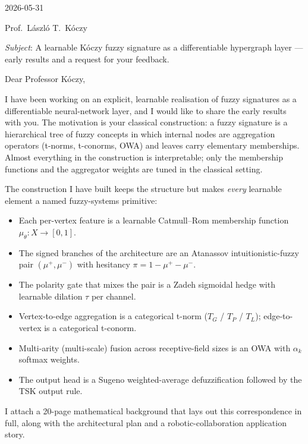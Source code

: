 \documentclass[11pt]{article}
\begin{document}
\begin{flushright}
2026-05-31
\end{flushright}

\noindent Prof.\ László T.\ Kóczy

\textit{Subject}: A learnable Kóczy fuzzy signature as a
differentiable hypergraph layer — early results and a request for
your feedback.

Dear Professor Kóczy,

I have been working on an explicit, learnable realisation of fuzzy
signatures as a differentiable neural-network layer, and I would
like to share the early results with you. The motivation is your
classical construction: a fuzzy signature is a hierarchical tree of
fuzzy concepts in which internal nodes are aggregation operators
(t-norms, t-conorms, OWA) and leaves carry elementary memberships.
Almost everything in the construction is interpretable; only the
membership functions and the aggregator weights are tuned in the
classical setting.

The construction I have built keeps the structure but makes
\emph{every} learnable element a named fuzzy-systems primitive:

\begin{itemize}
  \item Each per-vertex feature is a learnable Catmull--Rom
        membership function $\mu_\theta\colon X\to[0,1]$.
  \item The signed branches of the architecture are an Atanassov
        intuitionistic-fuzzy pair $(\mu^+, \mu^-)$ with hesitancy
        $\pi = 1 - \mu^+ - \mu^-$.
  \item The polarity gate that mixes the pair is a Zadeh sigmoidal
        hedge with learnable dilation $\tau$ per channel.
  \item Vertex-to-edge aggregation is a categorical t-norm ($T_G$ /
        $T_P$ / $T_L$); edge-to-vertex is a categorical t-conorm.
  \item Multi-arity (multi-scale) fusion across receptive-field
        sizes is an OWA with $\alpha_k$ softmax weights.
  \item The output head is a Sugeno weighted-average defuzzification
        followed by the TSK output rule.
\end{itemize}

I attach a 20-page mathematical background that lays out this
correspondence in full, along with the architectural plan and a
robotic-collaboration application story.
\end{document}
